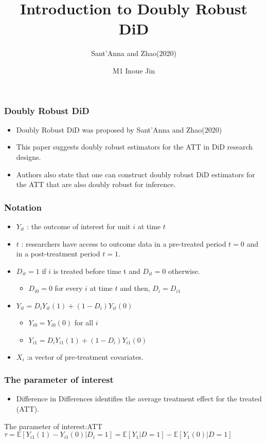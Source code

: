 \documentclass{beamer}
\title{Introduction to Doubly Robust DiD}
\subtitle{Sant'Anna and Zhao(2020)}
\author{M1 Inoue Jin}
\institute{Hitotsubashi University}
\begin{document}
\setlength{\abovedisplayskip}{3pt}
\setlength{\belowdisplayskip}{3pt}

\begin{frame}\frametitle{}
    \titlepage
\end{frame}

\begin{frame}\frametitle{Doubly Robust DiD}
    \begin{itemize}
        \item Doubly Robust DiD was proposed by Sant'Anna and Zhao(2020)
        \item This paper suggests doubly robust estimators for the ATT in DiD research designs.
        \item Authors also state that one can construct doubly robust DiD estimators for the ATT that are also doubly robust for inference.
    \end{itemize}
\end{frame}

\begin{frame}\frametitle{Notation}
    \begin{itemize}
        \item $Y_{it}$ : the outcome of interest for unit $i$ at time $t$
        \item $t$ : researchers have access to outcome data in a pre-treated period $t = 0$ and in a post-treatment period $t = 1$.
        \item $D_{it} = 1$ if $i$ is treated before time t and $D_{it} = 0$ otherwise.
        \begin{itemize}
            \item $D_{i0} = 0$ for every $i$ at time $t$ and then, $D_{i} = D_{i1}$
        \end{itemize}
        \item $Y_{it} = D_{i}Y_{it}(1) + (1 - D_{i})Y_{it}(0)$
        \begin{itemize}
            \item $Y_{i0} = Y_{i0}(0)$ for all $i$ 
            \item $Y_{i1} = D_{i}Y_{i1}(1) + (1 - D_{i})Y_{i1}(0)$
        \end{itemize}
        \item $X_{i}$ :a vector of pre-treatment covariates.
    \end{itemize}
\end{frame}

\begin{frame}\frametitle{The parameter of interest}
    \begin{itemize}
        \item Difference in Differences identifies the average treatment effect for the treated (ATT). 
    \end{itemize}
    \begin{block}{The parameter of interest:ATT}
        $\tau = \mathbb{E}[Y_{i1}(1) - Y_{i1}(0)| D_{i} = 1] = \mathbb{E}[Y_{1} |D = 1] - \mathbb{E}[Y_{1}(0) | D = 1]$
    \end{block}
\end{frame}
\end{document}
